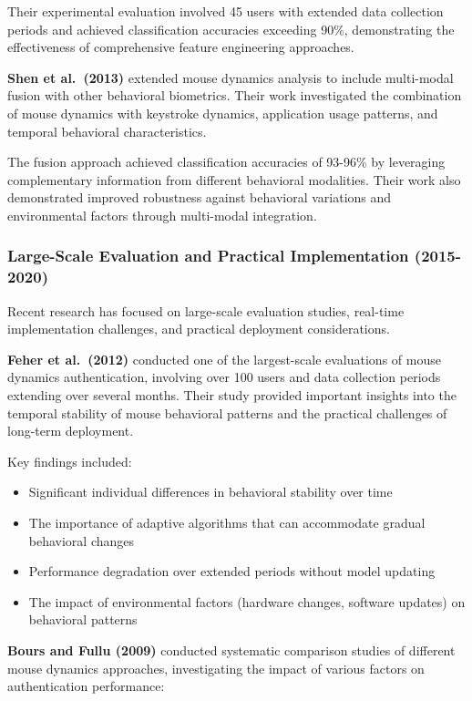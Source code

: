 \documentclass[
  12pt,
  a4paper,
]{report}
\providecommand{\tightlist}{%
  \setlength{\itemsep}{0pt}\setlength{\parskip}{0pt}}
\begin{document}
Their experimental evaluation involved 45 users with extended data
collection periods and achieved classification accuracies exceeding
90\%, demonstrating the effectiveness of comprehensive feature
engineering approaches.

\textbf{Shen et al.~(2013)} extended mouse dynamics analysis to include
multi-modal fusion with other behavioral biometrics. Their work
investigated the combination of mouse dynamics with keystroke dynamics,
application usage patterns, and temporal behavioral characteristics.

The fusion approach achieved classification accuracies of 93-96\% by
leveraging complementary information from different behavioral
modalities. Their work also demonstrated improved robustness against
behavioral variations and environmental factors through multi-modal
integration.

\subsubsection{Large-Scale Evaluation and Practical Implementation
(2015-2020)}\label{large-scale-evaluation-and-practical-implementation-2015-2020}

Recent research has focused on large-scale evaluation studies, real-time
implementation challenges, and practical deployment considerations.

\textbf{Feher et al.~(2012)} conducted one of the largest-scale
evaluations of mouse dynamics authentication, involving over 100 users
and data collection periods extending over several months. Their study
provided important insights into the temporal stability of mouse
behavioral patterns and the practical challenges of long-term
deployment.

Key findings included:

\begin{itemize}
\tightlist
\item
  Significant individual differences in behavioral stability over time
\item
  The importance of adaptive algorithms that can accommodate gradual
  behavioral changes
\item
  Performance degradation over extended periods without model updating
\item
  The impact of environmental factors (hardware changes, software
  updates) on behavioral patterns
\end{itemize}

\textbf{Bours and Fullu (2009)} conducted systematic comparison studies
of different mouse dynamics approaches, investigating the impact of
various factors on authentication performance:
\end{document}
